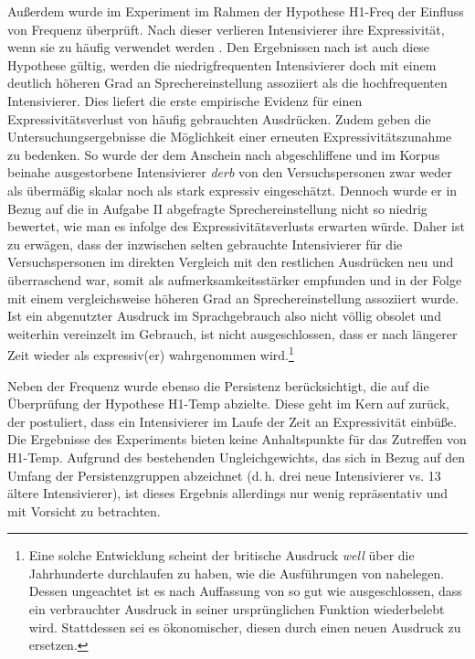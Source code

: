 Außerdem wurde im Experiment im Rahmen der Hypothese {H1-Freq} der Einfluss von Frequenz überprüft. Nach dieser verlieren Intensivierer ihre Expressivität, wenn sie zu häufig verwendet werden {\citep[vgl.][2]{Hauschild.1899}}. Den Ergebnissen nach ist auch diese Hypothese gültig, werden die niedrigfrequenten Intensivierer doch mit einem deutlich höheren Grad an Sprechereinstellung assoziiert als die hochfrequenten Intensivierer. Dies liefert die erste empirische Evidenz für einen Expressivitätsverlust von häufig gebrauchten Ausdrücken. Zudem geben die Untersuchungsergebnisse die Möglichkeit einer erneuten Expressivitätszunahme zu bedenken. So wurde der dem {Anschein} nach abgeschliffene und im Korpus beinahe ausgestorbene Intensivierer \textit{derb} von den Versuchspersonen zwar weder als übermäßig skalar noch als stark expressiv eingeschätzt. Dennoch wurde er in Bezug auf die in Aufgabe II abgefragte Sprechereinstellung nicht so niedrig bewertet, wie man es infolge des Expressivitätsverlusts erwarten würde. Daher ist zu erwägen, dass der inzwischen selten gebrauchte Intensivierer für die Versuchspersonen im direkten Vergleich mit den restlichen Ausdrücken neu und überraschend war, somit als aufmerksamkeitsstärker empfunden und in der Folge mit einem vergleichsweise höheren Grad an Sprechereinstellung assoziiert wurde. Ist ein abgenutzter Ausdruck im Sprachgebrauch also nicht völlig obsolet und weiterhin vereinzelt im Gebrauch, ist nicht ausgeschlossen, dass er nach längerer Zeit wieder als expressiv(er) wahrgenommen wird.\footnote{Eine solche Entwicklung scheint der britische Ausdruck \textit{well} über die Jahrhunderte durchlaufen zu haben, wie die Ausführungen von \citet[]{Stratton.2018,Stratton.2020d,Stratton.2020a,Stratton.2022a} nahelegen. Dessen ungeachtet ist es nach Auffassung von \citet[95]{Dahl.2001} so gut wie ausgeschlossen, dass ein verbrauchter Ausdruck in seiner ursprünglichen Funktion wiederbelebt wird. Stattdessen sei es ökonomischer, diesen durch einen neuen Ausdruck zu ersetzen.}


Neben der Frequenz wurde ebenso die Persistenz berücksichtigt, die auf die Überprüfung der Hypothese H1-Temp abzielte. Diese geht im Kern auf \citet[59]{Tobler.1868} zurück, der postuliert, dass ein Intensivierer im Laufe der Zeit an Expressivität einbüße. Die Ergebnisse des Experiments bieten keine Anhaltspunkte für das Zutreffen von H1-Temp. Aufgrund des bestehenden Ungleichgewichts, das sich in Bezug auf den Umfang der Persistenzgruppen abzeichnet (d.\,h. drei neue Intensivierer vs. 13 ältere Intensivierer), ist dieses Ergebnis allerdings nur wenig repräsentativ und mit Vorsicht zu betrachten.


